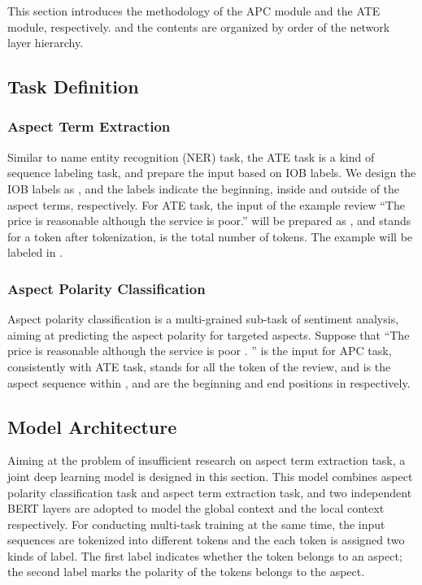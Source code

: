 \documentclass[a4paper,fleqn]{cas-sc}
\begin{document}
This section introduces the methodology of the APC module and the ATE module, respectively. and the contents are organized by order of the network layer hierarchy.

\subsection{Task Definition}
\subsubsection{Aspect Term Extraction}
Similar to name entity recognition (NER) task, the ATE task is a kind of sequence labeling task, and prepare the input based on IOB labels. We design the IOB labels as , and the labels indicate the beginning, inside and outside of the aspect terms, respectively. For ATE task, the input of the example review ``The price is reasonable although the service is poor.'' will be prepared as , and  stands for a token after tokenization,  is the total number of tokens. The example will be labeled in . 

\subsubsection{Aspect Polarity Classification}
Aspect polarity classification is a multi-grained sub-task of sentiment analysis, aiming at predicting the aspect polarity for targeted aspects. Suppose that ``The price is reasonable although the service is poor . '' is the input for APC task, consistently with ATE task,  stands for all the token of the review, and  is the aspect sequence within ,  and  are the beginning and end positions in  respectively. 

\subsection{Model Architecture}

Aiming at the problem of insufficient research on aspect term extraction task, a joint deep learning model is designed in this section. This model combines aspect polarity classification task and aspect term extraction task, and two independent BERT layers are adopted to model the global context and the local context respectively. For conducting multi-task training at the same time, the input sequences are tokenized into different tokens and the each token is assigned two kinds of label. The first label indicates whether the token belongs to an aspect; the second label marks the polarity of the tokens belongs to the aspect.
\end{document}
